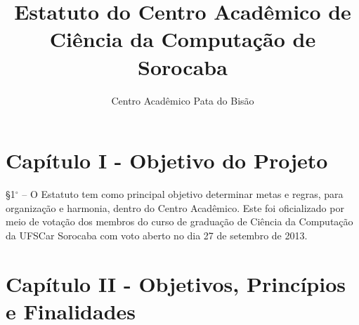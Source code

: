 \documentclass[12pt]{article}
\title{Estatuto do Centro Acadêmico de Ciência da Computação de Sorocaba}
\author{Centro Acadêmico Pata do Bisão}
\begin{document}
\maketitle 

\section{Capítulo I - Objetivo do Projeto}
    \S 1$^{\circ}$ -- O Estatuto tem como principal objetivo determinar metas e
    regras, para organização e harmonia, dentro do Centro Acadêmico. Este foi
    oficializado por meio de votação dos membros do curso de graduação de
    Ciência da Computação da UFSCar Sorocaba com voto aberto no dia 27 de
    setembro de 2013.

\section{Capítulo II - Objetivos, Princípios e Finalidades}
\end{document}
